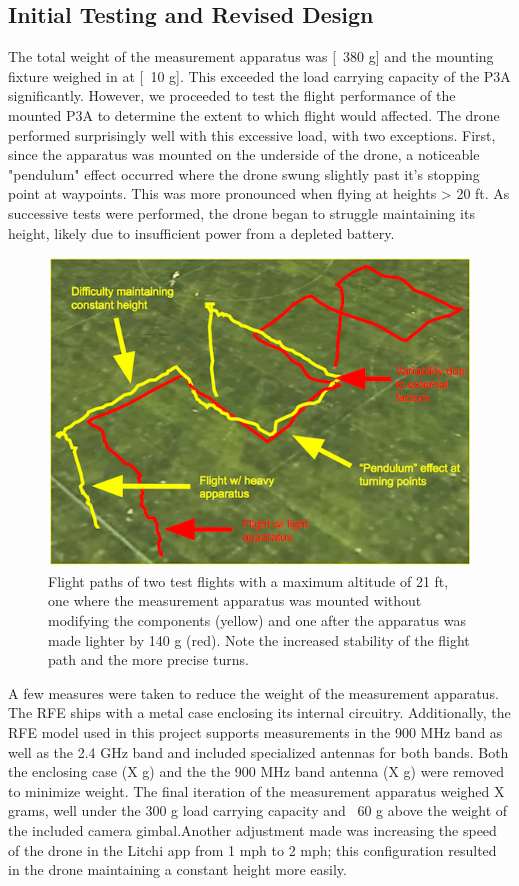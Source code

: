 \documentclass[pageno]{jpaper}
\begin{document}
 \subsection{Initial Testing and Revised Design}
 The total weight of the measurement apparatus was [~380 g] and the mounting fixture weighed in at [~10 g]. This exceeded the load carrying capacity of the P3A significantly. However, we proceeded to test the flight performance of the mounted P3A to determine the extent to which flight would affected. The drone performed surprisingly well with  this excessive load, with two exceptions. First, since the apparatus was mounted on the underside of the drone, a noticeable "pendulum" effect occurred where the drone swung slightly past it's stopping point at waypoints. This was more pronounced when flying at heights > 20 ft. As successive tests were performed, the drone began to struggle maintaining its height, likely due to insufficient power from a depleted battery. 
 
 \begin{figure}[h]
 	\caption{Flight paths of two test flights with a maximum altitude of 21 ft, one where the measurement apparatus was mounted without modifying the components (yellow) and one after the apparatus was made lighter by 140 g (red). Note the increased stability of the flight path and the more precise turns. }
 	\includegraphics{performance_comparison}
 	\centering
 \end{figure}
 
 A few measures were taken to reduce the weight of the measurement apparatus. The RFE ships with a metal case enclosing its internal circuitry. Additionally, the RFE model used in this project supports measurements in the 900 MHz band as well as the 2.4 GHz band and included specialized antennas for both bands. Both the enclosing case (X g) and the the 900 MHz band antenna (X g) were removed to minimize weight. The final iteration of the measurement apparatus weighed X grams, well under the 300 g load carrying capacity and ~60 g above the weight of the included camera gimbal.Another adjustment made was increasing the speed of the drone in the Litchi app from 1 mph to 2 mph; this configuration resulted in the drone maintaining a constant height more easily.
 
\end{document}
